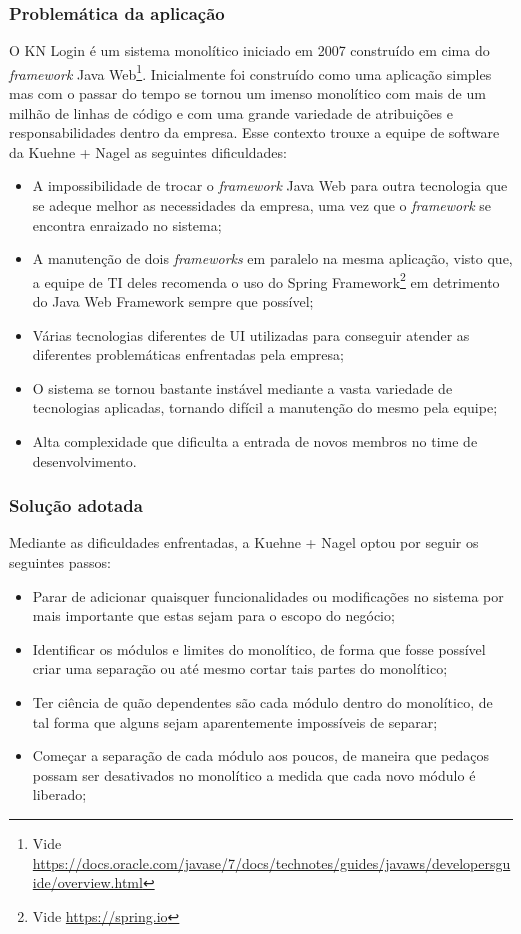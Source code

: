 \subsubsection{Problemática da aplicação}

O KN Login é um sistema monolítico iniciado em 2007 construído em cima do \textit{framework}
Java Web\footnote{Vide \url{https://docs.oracle.com/javase/7/docs/technotes/guides/javaws/developersguide/overview.html}}.
Inicialmente foi construído como uma aplicação simples mas com o passar do tempo se tornou um imenso
monolítico com mais de um milhão de linhas de código e com uma grande variedade de atribuições e
responsabilidades dentro da empresa. Esse contexto trouxe a equipe de software da Kuehne + Nagel as
seguintes dificuldades:

\begin{itemize}
    \item A impossibilidade de trocar o \textit{framework} Java Web para outra tecnologia que se
        adeque melhor as necessidades da empresa, uma vez que o \textit{framework} se encontra enraizado no sistema;
    \item A manutenção de dois \textit{frameworks} em paralelo na mesma aplicação, visto que, a
    equipe de \gls{TI} deles recomenda o uso do Spring Framework\footnote{Vide \url{https://spring.io}} em
    detrimento do Java Web Framework sempre que possível;
    \item Várias tecnologias diferentes de \gls{UI} utilizadas para conseguir atender as diferentes
    problemáticas enfrentadas pela empresa;
    \item O sistema se tornou bastante instável mediante a vasta variedade de tecnologias aplicadas,
    tornando difícil a manutenção do mesmo pela equipe;
    \item Alta complexidade que dificulta a entrada de novos membros no time de desenvolvimento.
\end{itemize}

\subsubsection{Solução adotada}

Mediante as dificuldades enfrentadas, a Kuehne + Nagel optou por seguir os seguintes passos:

\begin{itemize}
    \item Parar de adicionar quaisquer funcionalidades ou modificações no sistema por mais
        importante que estas sejam para o escopo do negócio;
    \item Identificar os módulos e limites do monolítico, de forma que fosse possível criar uma
        separação ou até mesmo cortar tais partes do monolítico;
    \item Ter ciência de quão dependentes são cada módulo dentro do monolítico, de tal forma que
        alguns sejam aparentemente impossíveis de separar;
    \item Começar a separação de cada módulo aos poucos, de maneira que pedaços possam ser
        desativados no monolítico a medida que cada novo módulo é liberado;
\end{itemize}

